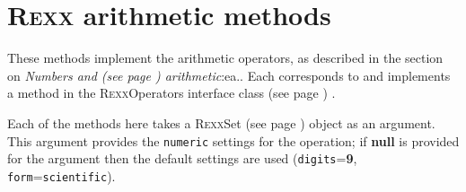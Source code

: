 \section{R\textsc{exx} arithmetic methods}\label{refrexxops}
 These methods implement the \nr{} arithmetic operators, as
described in the section on  \emph{Numbers and (see page \pageref{refnums}) 
arithmetic}:ea..
Each corresponds to and implements a
method in the  R\textsc{exx}Operators interface class (see page \pageref{refnlrops}) .
 
Each of the methods here takes a  R\textsc{exx}Set (see page \pageref{refnlrset})  object as
an argument.  This argument provides the \texttt{numeric} settings for
the operation; if \textbf{null} is provided for the argument then the
default settings are used (\texttt{digits}=\textbf{9},
\texttt{form}=\texttt{scientific}).
 
